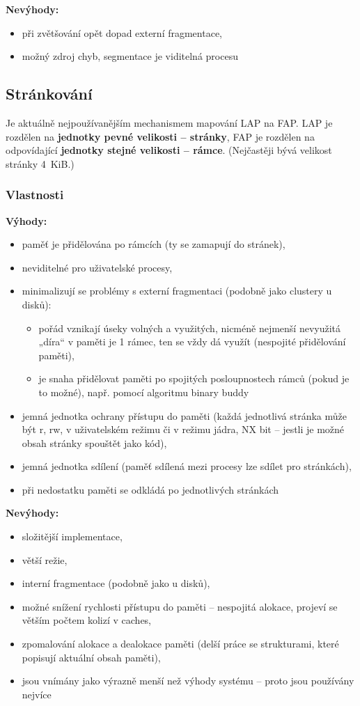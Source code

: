 \documentclass[a4paper, 11pt]{article}
\begin{document}
\textbf{Nevýhody:}
\begin{itemize}
 \item při zvětšování opět dopad externí fragmentace,
 \item možný zdroj chyb, segmentace je viditelná procesu
\end{itemize}

\subsection{Stránkování}
Je aktuálně nejpoužívanějším mechanismem mapování LAP na FAP. LAP je rozdělen na \textbf{jednotky pevné velikosti -- stránky}, FAP je rozdělen na odpovídající \textbf{jednotky stejné velikosti -- rámce}. (Nejčastěji bývá velikost stránky 4~KiB.)
 
\subsubsection{Vlastnosti}
\textbf{Výhody:}
\begin{itemize}
    \item paměť je přidělována po rámcích (ty se zamapují do stránek),
    \item neviditelné pro uživatelské procesy,
    \item minimalizují se problémy s externí fragmentaci (podobně jako clustery u disků):
    \begin{itemize}
        \item pořád vznikají úseky volných a využitých, nicméně nejmenší nevyužitá „díra“ v paměti je 1 rámec, ten se vždy dá využít (nespojité přidělování paměti),

        \item je snaha přidělovat paměti po spojitých posloupnostech rámců (pokud je to možné), např. pomocí algoritmu binary buddy
    \end{itemize}
    \item jemná jednotka ochrany přístupu do paměti (každá jednotlivá stránka může být r, rw, v uživatelském režimu či v režimu jádra, NX bit -- jestli je možné obsah stránky spouštět jako kód),
    \item jemná jednotka sdílení (paměť sdílená mezi procesy lze sdílet pro stránkách),
    \item při nedostatku paměti se odkládá po jednotlivých stránkách
\end{itemize}
 
\textbf{Nevýhody:}
\begin{itemize}
    \item složitější implementace,
    \item větší režie,
    \item interní fragmentace (podobně jako u disků),
    \item možné snížení rychlosti přístupu do paměti -- nespojitá alokace, projeví se větším počtem kolizí v caches,
    \item zpomalování alokace a dealokace paměti (delší práce se strukturami, které popisují aktuální obsah paměti),
    \item jsou vnímány jako výrazně menší než výhody systému -- proto jsou používány nejvíce
\end{itemize}
\end{document}
